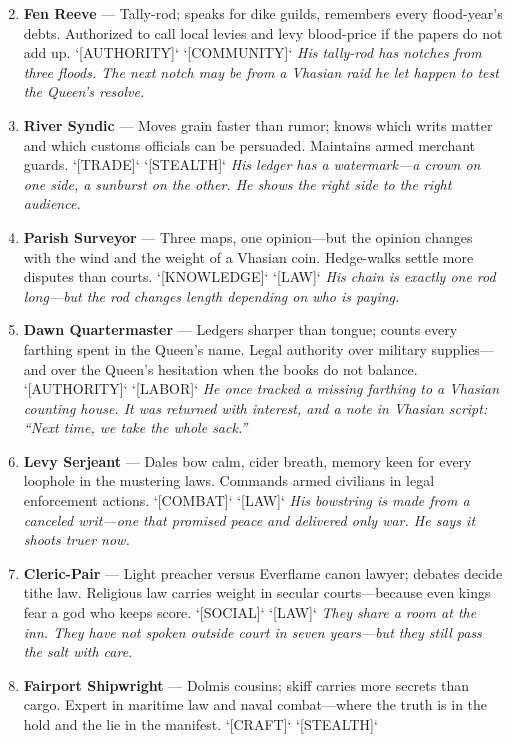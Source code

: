 \begin{enumerate}
\setcounter{enumi}{1}
\item \textbf{Fen Reeve} --- Tally-rod; speaks for dike guilds, remembers every flood-year's debts. Authorized to call local levies and levy blood-price if the papers do not add up. `[AUTHORITY]` `[COMMUNITY]`
  \hfill \textit{His tally-rod has notches from three floods. The next notch may be from a Vhasian raid he let happen to test the Queen's resolve.}
\item \textbf{River Syndic} --- Moves grain faster than rumor; knows which writs matter and which customs officials can be persuaded. Maintains armed merchant guards. `[TRADE]` `[STEALTH]`
  \hfill \textit{His ledger has a watermark---a crown on one side, a sunburst on the other. He shows the right side to the right audience.}
\item \textbf{Parish Surveyor} --- Three maps, one opinion---but the opinion changes with the wind and the weight of a Vhasian coin. Hedge-walks settle more disputes than courts. `[KNOWLEDGE]` `[LAW]`
  \hfill \textit{His chain is exactly one rod long---but the rod changes length depending on who is paying.}
\item \textbf{Dawn Quartermaster} --- Ledgers sharper than tongue; counts every farthing spent in the Queen's name. Legal authority over military supplies---and over the Queen's hesitation when the books do not balance. `[AUTHORITY]` `[LABOR]`
  \hfill \textit{He once tracked a missing farthing to a Vhasian counting house. It was returned with interest, and a note in Vhasian script: ``Next time, we take the whole sack.''}
\item \textbf{Levy Serjeant} --- Dales bow calm, cider breath, memory keen for every loophole in the mustering laws. Commands armed civilians in legal enforcement actions. `[COMBAT]` `[LAW]`
  \hfill \textit{His bowstring is made from a canceled writ---one that promised peace and delivered only war. He says it shoots truer now.}
\item \textbf{Cleric-Pair} --- Light preacher versus Everflame canon lawyer; debates decide tithe law. Religious law carries weight in secular courts---because even kings fear a god who keeps score. `[SOCIAL]` `[LAW]`
  \hfill \textit{They share a room at the inn. They have not spoken outside court in seven years---but they still pass the salt with care.}
\item \textbf{Fairport Shipwright} --- Dolmis cousins; skiff carries more secrets than cargo. Expert in maritime law and naval combat---where the truth is in the hold and the lie in the manifest. `[CRAFT]` `[STEALTH]`

\end{enumerate}

